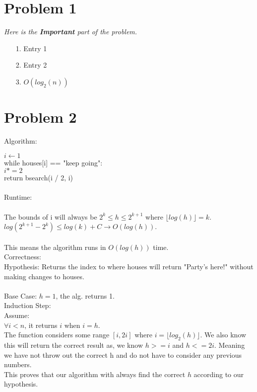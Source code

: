 \documentclass[11pt,letter]{article}
\newcommand{\2}{\{0, 1\}}
\newcommand{\1}{\mathds{1}}
\theoremstyle{definition}
\begin{document}
\section*{Problem 1}
\textit{Here is the \textbf{Important} part of the problem.}
\begin{enumerate}
	\item[1.] Entry 1
	\item[2.] Entry 2
	\item[3.] $O(log_2(n))$
\end{enumerate}

\section*{Problem 2}

Algorithm:

$i \leftarrow 1$ \\
while houses[i] == "keep going": \\
	\hspace*{6mm} $i *= 2$ \\
return bsearch(i / 2, i) \\\\

Runtime: \\\\
The bounds of i will always be $2^k \leq h \leq 2^{k+1}$ where $\lfloor{log(h)}\rfloor = k$.\\
$log(2^{k+1} -2^k) \leq log(k) + C \rightarrow O(log(h))$.\\\\
This means the algorithm runs in $O(log(h))$ time.\\

Correctness: \\
Hypothesis: Returns the index to where houses will return "Party's here!" without making changes to houses.\\\\

Base Case: $h = 1$, the alg. returns 1. \checkmark \\
Induction Step: \\
Assume: \\
$\forall i < n$, it returns $i$ when $i=h$.\\

\hspace*{6mm} The function considers some range $[i, 2i]$ where $i=\lfloor{log_2(h)}\rfloor$. We also know this will return the correct result as, we know $h >= i$ and $h <= 2i$. Meaning we have not throw out the correct h and do not have to consider any previous numbers.\\
This proves that our algorithm with always find the correct $h$ according to our hypothesis.
\end{document}

